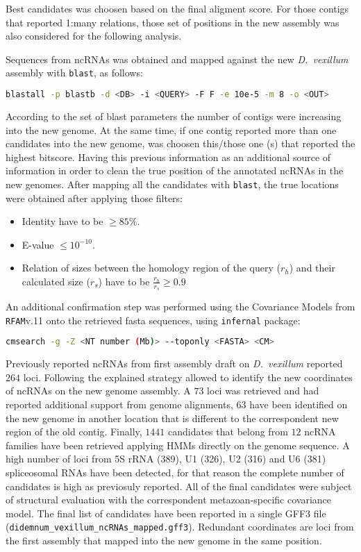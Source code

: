 \documentclass[11pt]{article}
\begin{document}
Best candidates was choosen based on the final aligment score. For those
contigs that reported 1:many relations, those set of positions in the new
assembly was also considered for the following analysis.

Sequences from ncRNAs was obtained and mapped against the new \textit{D.\
vexillum} assembly with \texttt{blast}, as follows:

\begin{lstlisting}[language=bash, breaklines=true]
blastall -p blastb -d <DB> -i <QUERY> -F F -e 10e-5 -m 8 -o <OUT>
\end{lstlisting}

According to the set of blast parameters the number of contigs were increasing
into the new genome. At the same time, if one contig reported more than one
candidates into the new genome, was choosen this/those one (s) that reported the 
highest bitscore. Having this previous information as an additional source of 
information in order to clean the true position of the annotated ncRNAs in the
new genomes. After mapping all the candidates with \texttt{blast}, the true locations
were obtained after applying those filters:
\begin{itemize}
 \item Identity have to be $\geq 85$\%.
 \item E-value $\leq 10^{-10}$.
 \item Relation of sizes between the homology region of the query
  ($r_h$) and their calculated size ($r_s$) have to be $\frac{r_h}{r_s} \geq 0.9$
\end{itemize}

An additional confirmation step was performed using the Covariance Models from
\texttt{RFAM}v.11 onto the retrieved fasta sequences, using \texttt{infernal} package:
\begin{lstlisting}[language=bash, breaklines=true]
cmsearch -g -Z <NT number (Mb)> --toponly <FASTA> <CM>
\end{lstlisting}

Previously reported ncRNAs from first assembly draft on \textit{D.\ vexillum} 
reported $264$ loci. Following the explained strategy allowed to identify the new
coordinates of ncRNAs on the new genome assembly. A $73$ loci was retrieved and
had reported additional support from genome alignments, $63$ have been
identified on the new genome in another location that is different to the
correspondent new region of the old contig. Finally, $1441$ candidates that belong
from $12$ ncRNA families have been retrieved applying HMMs directly on the
genome sequence. A high number of loci from 5S rRNA (389), U1 (326), U2 (316) and U6 (381) 
spliceosomal RNAs have been detected, for that reason the complete number of
candidates is high as previosuly reported.  All of the final candidates were
subject of structural evaluation with the correspondent metazoan-specific covariance model.
The final list of candidates have been reported in a single GFF3 file
(\texttt{didemnum\_vexillum\_ncRNAs\_mapped.gff3}). Redundant coordinates are loci
from the first assembly that mapped into the new genome in the same position.
\end{document}
